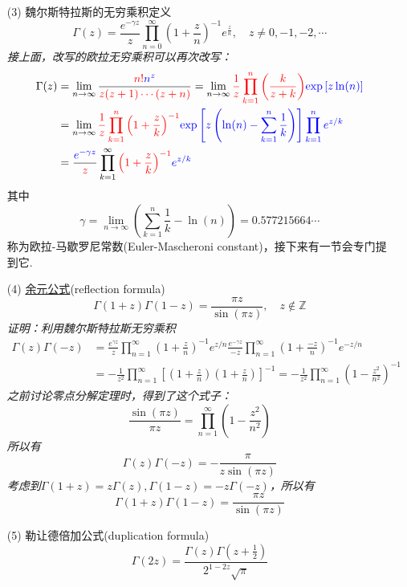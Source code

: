 \documentclass[main.tex]{subfiles}
\begin{document}
\begin{itemize}
    \item[(3)] 魏尔斯特拉斯的无穷乘积定义
    \[\Gamma(z) = \frac{e^{-\gamma z}}{z}\prod_{n=0}^{\infty}\left( 1+\frac{z}{n} \right)^{-1} e^{\frac{z}{n}}, \quad z \neq 0, -1, -2, \cdots\]
    \textit{接上面，改写的欧拉无穷乘积可以再次改写：}
    \begin{align*}
        \Gamma(z) &= \lim_{n \to \infty} \frac{{\color{red}n!}{\color{blue}n^z}}{{\color{red}z(z+1)\cdots(z+n)}} = \lim_{n \to \infty} {\color{red}\frac{1}{z}\prod_{k=1}^{n}\left(\frac{k}{z+k}\right)}{\color{blue}\exp\left[z\ln(n)\right]} \\
        &= \lim_{n \to \infty} {\color{red}\frac{1}{z}\prod_{k=1}^{n}\left(1+\frac{z}{k}\right)^{-1}}{\color{blue}\exp\left[z\left(\ln(n) - \sum_{k=1}^{n}\frac{1}{k}\right)\right]\prod_{k=1}^{n}e^{z/k}} \\
        &= \frac{{\color{blue}e^{-\gamma z}}}{{\color{red}z}}\prod_{k=1}^{\infty}{\color{red}\left(1+\frac{z}{k}\right)^{-1}}{\color{blue}e^{z/k}}
    \end{align*}
    其中
    \[\gamma = \lim_{n \to \infty} \left(\sum_{k=1}^{n}\frac{1}{k} - \ln(n)\right) = 0.577215664\cdots \]
    称为欧拉-马歇罗尼常数(Euler-Mascheroni constant)，接下来有一节会专门提到它.
    \item[(4)] \uline{余元公式}(reflection formula) 
    \[\Gamma(1+z)\Gamma(1-z) = \frac{\pi z}{\sin(\pi z)}, \quad z \not\in \mathbb{Z}\]
    \textit{
        证明：利用魏尔斯特拉斯无穷乘积
        \begin{align*}
            \Gamma(z)\Gamma(-z) &= \frac{e^{\gamma z}}{z}\prod_{n=1}^{\infty}\left(1+\frac{z}{n}\right)^{-1}e^{z/n}\frac{e^{-\gamma z}}{-z}\prod_{n=1}^{\infty}\left(1+\frac{-z}{n}\right)^{-1}e^{-z/n} \\
            &= -\frac{1}{z^2}\prod_{n=1}^{\infty}\left[\left(1+\frac{z}{n}\right)\left(1+\frac{z}{n}\right)\right]^{-1} = -\frac{1}{z^2}\prod_{n=1}^{\infty}\left(1-\frac{z^2}{n^2}\right)^{-1}
        \end{align*}
        之前讨论零点分解定理时，得到了这个式子：
        \[\frac{\sin(\pi z)}{\pi z} = \prod_{n=1}^{\infty}\left(1-\frac{z^2}{n^2}\right)\]
        所以有
        \[\Gamma(z)\Gamma(-z) = -\frac{\pi}{z\sin(\pi z)}\]
        考虑到\(\Gamma(1+z)=z\Gamma(z), \Gamma(1-z) = -z\Gamma(-z)\)，所以有
        \[\Gamma(1+z)\Gamma(1-z) = \frac{\pi z}{\sin(\pi z)}\]
    }
    \item[(5)] 勒让德倍加公式(duplication formula)
    \[ \Gamma(2z) = \frac{\Gamma(z)\Gamma(z+\frac{1}{2})}{2^{1-2z}\sqrt{\pi}} \]
    \textit{
}
\end{itemize}
\end{document}
